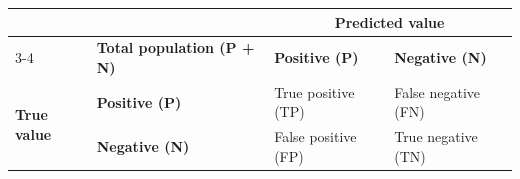 \begin{tabularx}{0.75\textwidth}{lXXX}
    \toprule
    & & \multicolumn{2}{c}{\textbf{Predicted value}} \\
    \cmidrule(lr){3-4}
    & \textbf{Total population (P + N)} & \textbf{Positive (P)} & \textbf{Negative (N)} \\
    \midrule
    \multirow{2}{*}{\textbf{True value}} 
        & \textbf{Positive (P)} & True positive (TP) & False negative (FN) \\
    \cmidrule(lr){2-4}
        & \textbf{Negative (N)} & False positive (FP) & True negative (TN) \\
    \bottomrule
\end{tabularx}